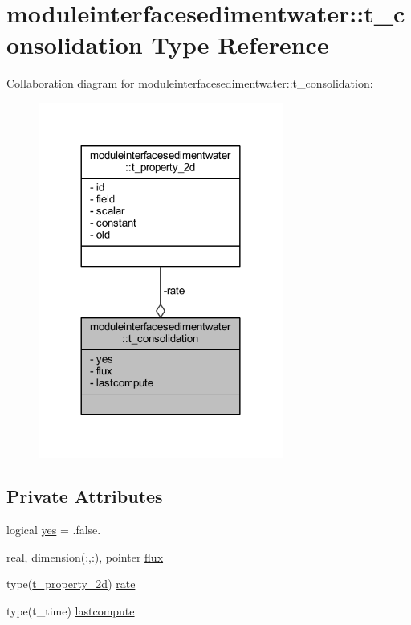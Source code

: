 \hypertarget{structmoduleinterfacesedimentwater_1_1t__consolidation}{}\section{moduleinterfacesedimentwater\+:\+:t\+\_\+consolidation Type Reference}
\label{structmoduleinterfacesedimentwater_1_1t__consolidation}


Collaboration diagram for moduleinterfacesedimentwater\+:\+:t\+\_\+consolidation\+:\nopagebreak
\begin{figure}[H]
\begin{center}
\leavevmode
\includegraphics[width=228pt]{structmoduleinterfacesedimentwater_1_1t__consolidation__coll__graph}
\end{center}
\end{figure}
\subsection*{Private Attributes}
\begin{DoxyCompactItemize}
\item 
logical \mbox{\hyperlink{structmoduleinterfacesedimentwater_1_1t__consolidation_a979a6deccc3aa1a1c0c18a31dc7b5b2d}{yes}} = .false.
\item 
real, dimension(\+:,\+:), pointer \mbox{\hyperlink{structmoduleinterfacesedimentwater_1_1t__consolidation_aab817619dd11a9093cc9e73454ff69ef}{flux}}
\item 
type(\mbox{\hyperlink{structmoduleinterfacesedimentwater_1_1t__property__2d}{t\+\_\+property\+\_\+2d}}) \mbox{\hyperlink{structmoduleinterfacesedimentwater_1_1t__consolidation_a97865655fb408e334cbfa7689860d306}{rate}}
\item 
type(t\+\_\+time) \mbox{\hyperlink{structmoduleinterfacesedimentwater_1_1t__consolidation_a4fe7a4a55bfdf06eaf8b797c6651e9ac}{lastcompute}}
\end{DoxyCompactItemize}


